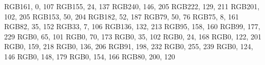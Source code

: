 \definecolor{RedViolet}         {RGB}{161, 0, 107} 	    %
\definecolor{Fuchsia}           {RGB}{155, 24, 137} 	%
\definecolor{Lavender}          {RGB}{240, 146, 205} 	%
\definecolor{Thistle}           {RGB}{222, 129, 211} 	%
\definecolor{Orchid}            {RGB}{201, 102, 205} 	%
\definecolor{DarkOrchid}        {RGB}{153, 50, 204} 	%
\definecolor{Purple}            {RGB}{182, 52, 187} 	%
\definecolor{Plum}              {RGB}{79, 50, 76} 	    %
\definecolor{Violet}            {RGB}{75, 8, 161} 	    %
\definecolor{RoyalPurple}       {RGB}{82, 35, 152} 	    %
\definecolor{BlueViolet}        {RGB}{33, 7, 106} 	    %
\definecolor{Periwinkle}        {RGB}{136, 132, 213} 	%
\definecolor{CadetBlue}	  	    {RGB}{95, 158, 160} 	%
\definecolor{CornflowerBlue}  	{RGB}{99, 177, 229} 	%
\definecolor{MidnightBlue}	  	{RGB}{0, 65, 101} 	    %
\definecolor{NavyBlue}          {RGB}{0, 70, 173}       %
\definecolor{RoyalBlue}         {RGB}{0, 35, 102}       %
\definecolor{Blue}              {RGB}{0, 24, 168}       %
\definecolor{Cerulean}          {RGB}{0, 122, 201}      %
\definecolor{Cyan}              {RGB}{0, 159, 218}      %
\definecolor{ProcessBlue}       {RGB}{0, 136, 206}      %
\definecolor{SkyBlue}           {RGB}{91, 198, 232}     %
\definecolor{Turquoise}         {RGB}{0, 255, 239} 	    %
\definecolor{TealBlue}          {RGB}{0, 124, 146} 	    %
\definecolor{Aquamarine}        {RGB}{0, 148, 179} 	    %
\definecolor{BlueGreen}         {RGB}{0, 154, 166} 	    %
\definecolor{Emerald}           {RGB}{80, 200, 120} 	%

